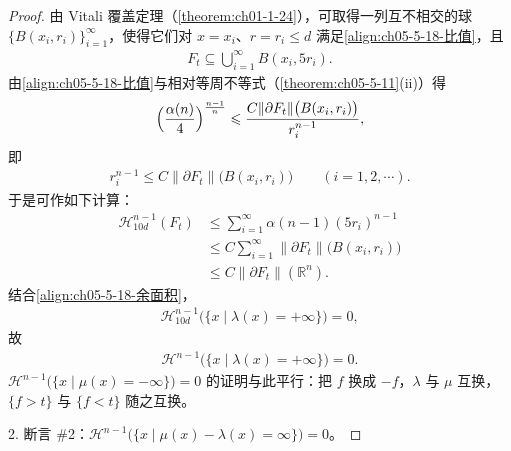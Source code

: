 \documentclass[../../main.tex]{subfiles}%
\begin{document}
\begin{proof}
由 Vitali 覆盖定理（\cref{theorem:ch01-1-24}），可取得一列互不相交的球 $\{B(x_i,r_i)\}_{i=1}^{\infty}$，使得它们对 $x=x_i$、$r=r_i\leqslant d$ 满足\eqref{align:ch05-5-18-比值}，且 %
\begin{align*}
F_t\subseteq\bigcup_{i=1}^{\infty}B(x_i,5r_i).
\end{align*}
由\eqref{align:ch05-5-18-比值}与相对等周不等式（\cref{theorem:ch05-5-11}(ii)）得 %
\begin{align*}
\Bigl(\frac{\alpha(n)}{4}\Bigr)^{\frac{n-1}{n}}\leqslant\frac{C\lVert\partial F_t\rVert\bigl(B(x_i,r_i)\bigr)}{r_i^{n-1}} ,
\end{align*}
即
\begin{align*}
r_i^{n-1}\leqslant C\lVert\partial F_t\rVert\bigl(B(x_i,r_i)\bigr)\qquad(i=1,2,\cdots).
\end{align*}
于是可作如下计算：
\begin{align*}
\mathcal{H}^{n-1}_{10d}(F_t)&\leqslant\sum_{i=1}^{\infty}\alpha(n-1)(5r_i)^{n-1}\\
&\leqslant C\sum_{i=1}^{\infty}\lVert\partial F_t\rVert\bigl(B(x_i,r_i)\bigr)\\
&\leqslant C\lVert\partial F_t\rVert(\mathbb{R}^n).
\end{align*}
结合\eqref{align:ch05-5-18-余面积}，
\begin{align*}
\mathcal{H}^{n-1}_{10d}\bigl(\{x\mid\lambda(x)=+\infty\}\bigr)=0 ,
\end{align*}
故
\begin{align*}
\mathcal{H}^{n-1}\bigl(\{x\mid\lambda(x)=+\infty\}\bigr)=0 .
\end{align*}
$\mathcal{H}^{n-1}\bigl(\{x\mid\mu(x)=-\infty\}\bigr)=0$ 的证明与此平行：把 $f$ 换成 $-f$，$\lambda$ 与 $\mu$ 互换，$\{f>t\}$ 与 $\{f<t\}$ 随之互换。

2. 断言 \#2：$\mathcal{H}^{n-1}\bigl(\{x\mid\mu(x)-\lambda(x)=\infty\}\bigr)=0$。


\end{proof}
\end{document}
